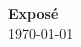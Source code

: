 \documentclass[a4paper]{article}
\begin{document}
\reversemarginpar{}
\thispagestyle{firstpagestyle}
\begin{center}
  \huge \textbf{Exposé}\\[8pt]
  \normalsize \today
\end{center}
\end{document}
